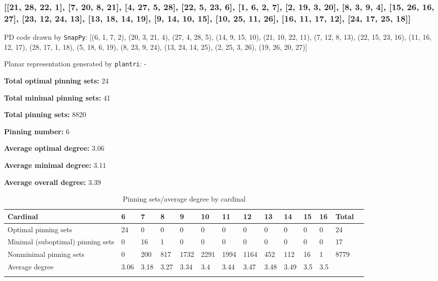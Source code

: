 \documentclass{article}%
\begin{document}
\newpage

\subsubsection{[[21, 28, 22, 1], [7, 20, 8, 21], [4, 27, 5, 28], [22, 5, 23, 6], [1, 6, 2, 7], [2, 19, 3, 20], [8, 3, 9, 4], [15, 26, 16, 27], [23, 12, 24, 13], [13, 18, 14, 19], [9, 14, 10, 15], [10, 25, 11, 26], [16, 11, 17, 12], [24, 17, 25, 18]]}

{\small\noindent PD code drawn by \texttt{SnapPy}: [(6, 1, 7, 2), (20, 3, 21, 4), (27, 4, 28, 5), (14, 9, 15, 10), (21, 10, 22, 11), (7, 12, 8, 13), (22, 15, 23, 16), (11, 16, 12, 17), (28, 17, 1, 18), (5, 18, 6, 19), (8, 23, 9, 24), (13, 24, 14, 25), (2, 25, 3, 26), (19, 26, 20, 27)]}

{\small\noindent Planar representation generated by \texttt{plantri}: -}

\begin{multicols}{2}
{\normalsize \noindent\textbf{Total optimal pinning sets:} 24

\noindent\textbf{Total minimal pinning sets:} 41

\noindent\textbf{Total pinning sets:} 8820

\noindent\textbf{Pinning number:} 6

}
\columnbreak

{\normalsize \noindent\textbf{Average optimal degree:} 3.06

\noindent\textbf{Average minimal degree:} 3.11

\noindent\textbf{Average overall degree:} 3.39

}
\end{multicols}

\begin{table}[ht]
	\caption{Pinning sets/average degree by cardinal}
	\centering
	\renewcommand{\arraystretch}{1.5}
	\begin{tabularx}{\textwidth}{lXXXXXXXXXXXXX}
		\toprule
			Cardinal & 6 & 7 & 8 & 9 & 10 & 11 & 12 & 13 & 14 & 15 & 16 & Total\\
			\hline
			Optimal pinning sets & 24 & 0 & 0 & 0 & 0 & 0 & 0 & 0 & 0 & 0 & 0 & 24 \\
			Minimal (suboptimal) pinning sets & 0 & 16 & 1 & 0 & 0 & 0 & 0 & 0 & 0 & 0 & 0 & 17 \\
			Nonminimal pinning sets & 0 & 200 & 817 & 1732 & 2291 & 1994 & 1164 & 452 & 112 & 16 & 1 & 8779 \\
			Average degree & 3.06 & 3.18 & 3.27 & 3.34 & 3.4 & 3.44 & 3.47 & 3.48 & 3.49 & 3.5 & 3.5 &  \\
		\bottomrule \\ 
	\end{tabularx}
\end{table}
\end{document}
